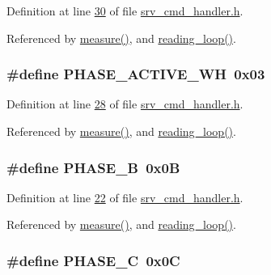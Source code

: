 Definition at line \hyperlink{a00043_source_l00030}{30} of file \hyperlink{a00043_source}{srv\-\_\-cmd\-\_\-handler.\-h}.



Referenced by \hyperlink{a00042_source_l00040}{measure()}, and \hyperlink{a00035_source_l00302}{reading\-\_\-loop()}.

\hypertarget{a00043_a4ee773ad07fa969b9990f9bb3a1a2093}{
\subsubsection[{P\-H\-A\-S\-E\-\_\-\-A\-C\-T\-I\-V\-E\-\_\-\-W\-H}]{\setlength{\rightskip}{0pt plus 5cm}\#define P\-H\-A\-S\-E\-\_\-\-A\-C\-T\-I\-V\-E\-\_\-\-W\-H~0x03}}\label{d6/d42/a00043_a4ee773ad07fa969b9990f9bb3a1a2093}


Definition at line \hyperlink{a00043_source_l00028}{28} of file \hyperlink{a00043_source}{srv\-\_\-cmd\-\_\-handler.\-h}.



Referenced by \hyperlink{a00042_source_l00040}{measure()}, and \hyperlink{a00035_source_l00302}{reading\-\_\-loop()}.

\hypertarget{a00043_ad7b96feed1e1c12515dad5e926b2c62e}{
\subsubsection[{P\-H\-A\-S\-E\-\_\-\-B}]{\setlength{\rightskip}{0pt plus 5cm}\#define P\-H\-A\-S\-E\-\_\-\-B~0x0\-B}}\label{d6/d42/a00043_ad7b96feed1e1c12515dad5e926b2c62e}


Definition at line \hyperlink{a00043_source_l00022}{22} of file \hyperlink{a00043_source}{srv\-\_\-cmd\-\_\-handler.\-h}.



Referenced by \hyperlink{a00042_source_l00040}{measure()}, and \hyperlink{a00035_source_l00302}{reading\-\_\-loop()}.

\hypertarget{a00043_a3ceb83fb10c2af19b468d508448f24e2}{
\subsubsection[{P\-H\-A\-S\-E\-\_\-\-C}]{\setlength{\rightskip}{0pt plus 5cm}\#define P\-H\-A\-S\-E\-\_\-\-C~0x0\-C}}\label{d6/d42/a00043_a3ceb83fb10c2af19b468d508448f24e2}



